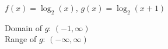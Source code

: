 {$f(x) = \log_{2}(x)$, $g(x) = \log_{2}(x+1)$\label{graphlogfirst} }
{Domain of $g$: $(-1, \infty)$\\
 Range of $g$:  $(-\infty, \infty)$ \\

\begin{center}
\end{center}}

